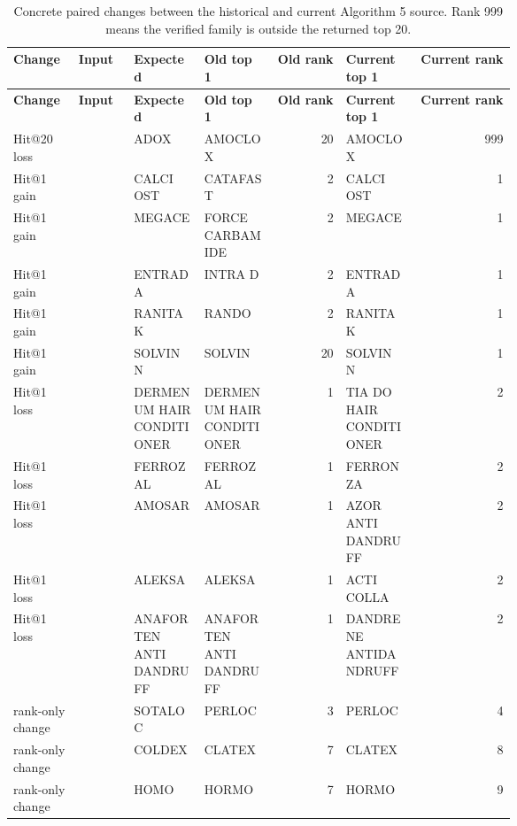 \begin{scriptsize}
\setlength{\tabcolsep}{1.5pt}
\renewcommand{\arraystretch}{1.05}
\begin{longtable}{@{}L{0.13\linewidth}L{0.11\linewidth}L{0.14\linewidth}L{0.14\linewidth}rL{0.14\linewidth}r@{}}
\caption{Concrete paired changes between the historical and current Algorithm 5 source. Rank 999 means the verified family is outside the returned top 20.}\label{tab:expanded-a5-revision-examples}\\
\toprule
\textbf{Change} & \textbf{Input} & \textbf{Expected} & \textbf{Old top 1} & \textbf{Old rank} & \textbf{Current top 1} & \textbf{Current rank} \\
\midrule
\endfirsthead
\toprule
\textbf{Change} & \textbf{Input} & \textbf{Expected} & \textbf{Old top 1} & \textbf{Old rank} & \textbf{Current top 1} & \textbf{Current rank} \\
\midrule
\endhead
Hit@20 loss & \texttt{} & ADOX & AMOCLOX & 20 & AMOCLOX & 999 \\
Hit@1 gain & \texttt{} & CALCI OST & CATAFAST & 2 & CALCI OST & 1 \\
Hit@1 gain & \texttt{} & MEGACE & FORCE CARBAMIDE & 2 & MEGACE & 1 \\
Hit@1 gain & \texttt{} & ENTRADA & INTRA D & 2 & ENTRADA & 1 \\
Hit@1 gain & \texttt{} & RANITAK & RANDO & 2 & RANITAK & 1 \\
Hit@1 gain & \texttt{} & SOLVIN N & SOLVIN & 20 & SOLVIN N & 1 \\
Hit@1 loss & \texttt{} & DERMENUM HAIR CONDITIONER & DERMENUM HAIR CONDITIONER & 1 & TIA DO HAIR CONDITIONER & 2 \\
Hit@1 loss & \texttt{} & FERROZAL & FERROZAL & 1 & FERRONZA & 2 \\
Hit@1 loss & \texttt{} & AMOSAR & AMOSAR & 1 & AZOR ANTI DANDRUFF & 2 \\
Hit@1 loss & \texttt{} & ALEKSA & ALEKSA & 1 & ACTI COLLA & 2 \\
Hit@1 loss & \texttt{} & ANAFORTEN ANTI DANDRUFF & ANAFORTEN ANTI DANDRUFF & 1 & DANDRENE ANTIDANDRUFF & 2 \\
rank-only change & \texttt{} & SOTALOC & PERLOC & 3 & PERLOC & 4 \\
rank-only change & \texttt{} & COLDEX & CLATEX & 7 & CLATEX & 8 \\
rank-only change & \texttt{} & HOMO & HORMO & 7 & HORMO & 9 \\
\bottomrule
\end{longtable}
\end{scriptsize}

